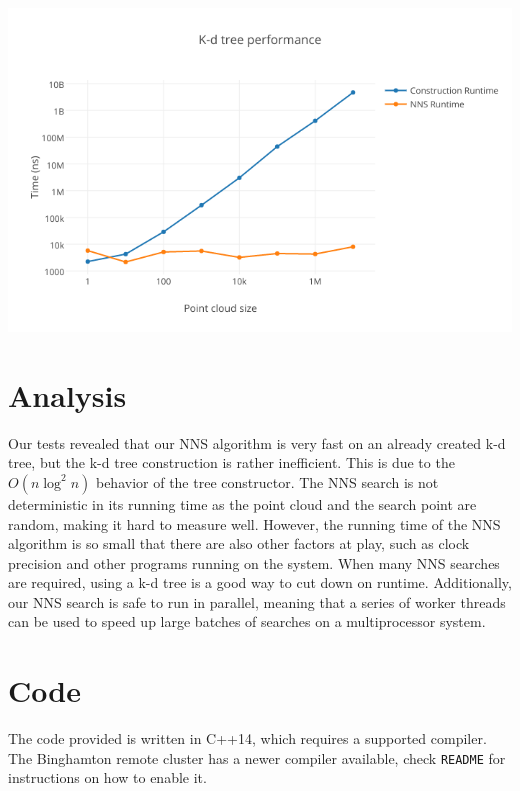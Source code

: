 \documentclass[a4paper,12pt]{article}
\def\code#1{\texttt{#1}}
\begin{document}
\includegraphics[width=15cm]{results.png}

\section{Analysis}
Our tests revealed that our NNS algorithm is very fast on an already created k-d tree, but
the k-d tree construction is rather inefficient.
This is due to the $O(n \log^2 n)$ behavior of the tree constructor.
The NNS search is not deterministic in its running time as the point cloud and the search
point are random, making it hard to measure well.
However, the running time of the NNS algorithm is so small that there are also other factors
at play, such as clock precision and other programs running on the system.
When many NNS searches are required, using a k-d tree is a good way to cut down on runtime.
Additionally, our NNS search is safe to run in parallel, meaning that a series of worker
threads can be used to speed up large batches of searches on a multiprocessor system.

\section{Code}
The code provided is written in C++14, which requires a supported compiler.
The Binghamton remote cluster has a newer compiler available, check \code{README}
for instructions on how to enable it.
\end{document}
